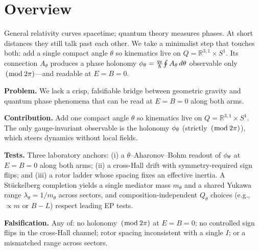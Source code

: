 \section*{Overview}

\begin{idea}
General relativity curves spacetime; quantum theory measures phases.
At short distances they still talk past each other. We take a minimalist step that touches both:
add a single compact angle $\theta$ so kinematics live on $Q=\mathbb{R}^{3,1}\times S^1$.
Its connection $A_\theta$ produces a phase holonomy
$\phi_\theta=\tfrac{q_\theta}{\hbar}\!\oint A_\theta\,d\theta$ observable only $\,(\bmod\,2\pi)$—and readable at $E=B=0$.
\end{idea}

\begin{tcolorbox}[enhanced,breakable,skin=enhancedfirst jigsaw,colback=blue!1!white,colframe=blue!40!black]
							\textbf{Problem.} We lack a crisp, falsifiable bridge between geometric gravity and quantum phase phenomena that can be read at $E=B=0$ along both arms.

							\textbf{Contribution.} Add one compact angle $\theta$ so kinematics live on $Q=\mathbb{R}^{3,1}\times S^1$. The only gauge\nobreakdash-invariant observable is the holonomy $\phi_\theta$ (strictly $\,(\bmod\,2\pi)$), which steers dynamics without local fields.

\textbf{Tests.} Three laboratory anchors: (i) a $\theta$–Aharonov–Bohm readout of $\phi_\theta$ at $E=B=0$ along both arms; (ii) a cross\nobreakdash-Hall drift with symmetry\nobreakdash-required sign flips; and (iii) a rotor ladder whose spacing fixes an effective inertia. A St\"uckelberg completion yields a single mediator mass $m_\theta$ and a shared Yukawa range $\lambda_\theta=1/m_\theta$ across sectors, and composition\nobreakdash-independent $Q_\theta$ choices (e.g., $\propto m$ or $B\!\!\!-
\!L$) respect leading EP tests.

							\textbf{Falsification.} Any of: no holonomy $\,(\bmod\,2\pi)$ at $E=B=0$; no controlled sign flips in the cross\nobreakdash-Hall channel; rotor spacing inconsistent with a single $I$; or a mismatched range across sectors.
\end{tcolorbox}

